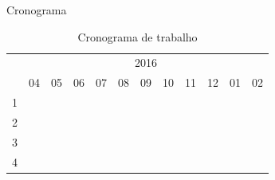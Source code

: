 \begin{frame}[allowframebreaks]{Cronograma}
	
	\begin{table}[!htbp]
		\centering
		\caption{Cronograma de trabalho}
		\label{Proposta de Trabalho:Tabela:Cronorgrama de Atividades a Serem Realizadas}
		\begin{tabular}{|c|c|c|c|c|c|c|c|c|c|c|c|}
			\hline
			& \multicolumn{11}{c|}{2016}                                                                                                                                                                                                                                                                                                                                                \\ \cline{2-12} 
			\multirow{-2}{*}{}      & 04                       & 05                       & 06                                              & 07                                              & 08                       & 09                       & 10                       & 11                       & 12                       & 01                       & 02                                            \\ \hline
			1                       & \cellcolor[HTML]{000000} &                          &                                                 &                                                 &                          &                          &                          &                          &                          &                          &                                               \\ \hline
			2                       &                          & \cellcolor[HTML]{000000} & \cellcolor[HTML]{000000}                        & \cellcolor[HTML]{000000}                        &                          &                          &                          &                          &                          &                          &                                               \\ \hline
			3                       &                          &                          & \cellcolor[HTML]{000000}{\color[HTML]{333333} } & \cellcolor[HTML]{000000}{\color[HTML]{333333} } & \cellcolor[HTML]{000000} &                          &                          &                          &                          &                          &                                               \\ \hline
			4                       &                          &                          &                                                 &                                                 & \cellcolor[HTML]{000000} & \cellcolor[HTML]{000000} & \cellcolor[HTML]{000000} &                          &                          &                          &                                               \\ \hline

\end{tabular}
\end{table}
\end{frame}
